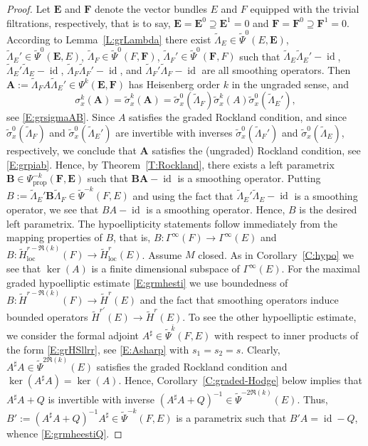\documentclass[reqno,12pt]{amsart}
\DeclareMathOperator{\id}{id}
\newcommand\prop{\textrm{prop}}
\newcommand\loc{\textrm{loc}}
\theoremstyle{plain}
\theoremstyle{definition}
\begin{document}
\begin{proof}
Let $\mathbf E$ and $\mathbf F$ denote the vector bundles $E$ and $F$ equipped with the trivial filtrations, respectively, that is to say, $\mathbf E=\mathbf E^0\supseteq\mathbf E^1=0$ and $\mathbf F=\mathbf F^0\supseteq\mathbf F^1=0$.
According to Lemma~\ref{L:grLambda} there exist $\tilde\Lambda_E\in\tilde\Psi^0(E,\mathbf E)$, $\tilde\Lambda_E'\in\tilde\Psi^0(\mathbf E,E)$, $\tilde\Lambda_F\in\tilde\Psi^0(F,\mathbf F)$, $\tilde\Lambda_F'\in\tilde\Psi^0(\mathbf F,F)$ such that $\tilde\Lambda_E\tilde\Lambda_E'-\id$, $\tilde\Lambda_E'\tilde\Lambda_E-\id$, $\tilde\Lambda_F\tilde\Lambda_F'-\id$, and $\tilde\Lambda_F'\tilde\Lambda_F-\id$ are all smoothing operators.
Then $\mathbf A:=\tilde\Lambda_FA\tilde\Lambda_E'\in\Psi^k(\mathbf E,\mathbf F)$ has Heisenberg order $k$ in the ungraded sense, and
$$
\sigma_x^k(\mathbf A)=\tilde\sigma^k_x(\mathbf A)=\tilde\sigma^0_x(\tilde\Lambda_F)\tilde\sigma^k_x(A)\tilde\sigma^0_x(\tilde\Lambda_E'),
$$
see \eqref{E:grsigmaAB}.
Since $A$ satisfies the graded Rockland condition, and since $\tilde\sigma^0_x(\tilde\Lambda_F)$ and $\tilde\sigma^0_x(\tilde\Lambda_E')$ are invertible with inverses $\tilde\sigma^0_x(\tilde\Lambda_F')$ and $\tilde\sigma^0_x(\tilde\Lambda_E)$, respectively, we conclude that $\mathbf A$ satisfies the (ungraded) Rockland condition, see \eqref{E:grpiab}.
Hence, by Theorem~\ref{T:Rockland}, there exists a left parametrix $\mathbf B\in\Psi^{-k}_\prop(\mathbf F,\mathbf E)$ such that $\mathbf B\mathbf A-\id$ is a smoothing operator.
Putting $B:=\tilde\Lambda_E'\mathbf B\tilde\Lambda_F\in\tilde\Psi^{-k}(F,E)$ and using the fact that $\tilde\Lambda_E'\tilde\Lambda_E-\id$ is a smoothing operator, we see that $BA-\id$ is a smoothing operator.
Hence, $B$ is the desired left parametrix.
The hypoellipticity statements follow immediately from the mapping properties of $B$, that is, $B\colon\Gamma^\infty(F)\to\Gamma^\infty(E)$ and $B\colon\tilde H_\loc^{r-\Re(k)}(F)\to\tilde H^r_\loc(E)$.
Assume $M$ closed.
As in Corollary~\ref{C:hypo} we see that $\ker(A)$ is a finite dimensional subspace of $\Gamma^\infty(E)$.
For the maximal graded hypoelliptic estimate \eqref{E:grmhesti} we use boundedness of $B\colon\tilde H^{r-\Re(k)}(F)\to\tilde H^r(E)$ and the fact that smoothing operators induce bounded operators $\tilde H^{r'}(E)\to\tilde H^r(E)$.
To see the other hypoelliptic estimate, we consider the formal adjoint $A^\sharp\in\tilde\Psi^{\bar k}(F,E)$ with respect to inner products of the form \eqref{E:grHSllrr}, see \eqref{E:Asharp} with $s_1=s_2=s$.
Clearly, $A^\sharp A\in\tilde\Psi^{2\Re(k)}(E)$ satisfies the graded Rockland condition and $\ker(A^\sharp A)=\ker(A)$.
Hence, Corollary~\ref{C:graded-Hodge} below implies that $A^\sharp A+Q$ is invertible with inverse $(A^\sharp A+Q)^{-1}\in\tilde\Psi^{-2\Re(k)}(E)$.
Thus, $B':=(A^\sharp A+Q)^{-1}A^\sharp\in\tilde\Psi^{-k}(F,E)$ is a parametrix such that $B'A=\id-Q$, whence \eqref{E:grmheestiQ}.
\end{proof}
\end{document}
